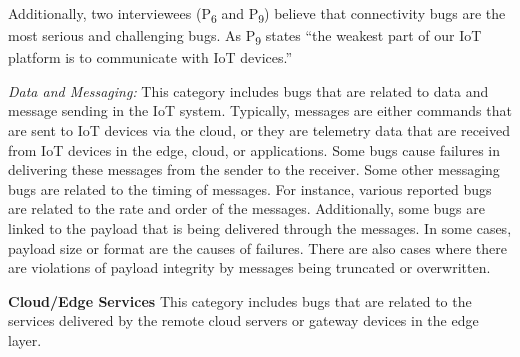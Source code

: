 Additionally, two interviewees (P\textsubscript{6} and P\textsubscript{9}) believe that connectivity bugs are the most serious and challenging bugs. As P\textsubscript{9} states \enquote{the weakest part of our IoT platform is to communicate with IoT devices.}

\textit{Data and Messaging:}
This category includes bugs that are related to data and message sending in the IoT system. Typically, messages are either commands that are sent to IoT devices via the cloud, or they are telemetry data that are received from IoT devices in the edge, cloud, or applications. Some bugs cause failures in delivering these messages from the sender to the receiver. Some other messaging bugs are related to the timing of messages. For instance, various reported bugs are related to the rate and order of the messages. Additionally, some bugs are linked to the payload that is being delivered through the messages. In some cases, payload size or format are the causes of failures. There are also cases where there are violations of payload integrity by messages being truncated or overwritten.


\textbf{Cloud/Edge Services}
This category includes bugs that are related to the services delivered by the remote cloud servers or gateway devices in the edge layer. 

